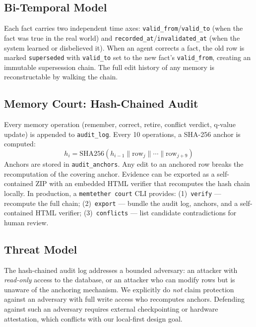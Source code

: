 \documentclass[11pt]{article}
\begin{document}
\subsection{Bi-Temporal Model}
Each fact carries two independent time axes: \texttt{valid\_from}/\texttt{valid\_to} (when the fact was true in the real world) and \texttt{recorded\_at}/\texttt{invalidated\_at} (when the system learned or disbelieved it). When an agent corrects a fact, the old row is marked \texttt{superseded} with \texttt{valid\_to} set to the new fact's \texttt{valid\_from}, creating an immutable supersession chain. The full edit history of any memory is reconstructable by walking the chain.

\subsection{Memory Court: Hash-Chained Audit}
Every memory operation (remember, correct, retire, conflict verdict, q-value update) is appended to \texttt{audit\_log}. Every 10 operations, a SHA-256 anchor is computed:
\[
h_i = \text{SHA256}(h_{i-1} \| \text{row}_{j} \| \cdots \| \text{row}_{j+9})
\]
Anchors are stored in \texttt{audit\_anchors}. Any edit to an anchored row breaks the recomputation of the covering anchor. Evidence can be exported as a self-contained ZIP with an embedded HTML verifier that recomputes the hash chain locally. In production, a \texttt{memtether court} CLI provides: (1)~\texttt{verify} --- recompute the full chain; (2)~\texttt{export} --- bundle the audit log, anchors, and a self-contained HTML verifier; (3)~\texttt{conflicts} --- list candidate contradictions for human review.

\subsection{Threat Model}
\label{sec:threat}
The hash-chained audit log addresses a bounded adversary: an attacker with \emph{read-only} access to the database, or an attacker who can modify rows but is unaware of the anchoring mechanism. We explicitly do \emph{not} claim protection against an adversary with full write access who recomputes anchors. Defending against such an adversary requires external checkpointing or hardware attestation, which conflicts with our local-first design goal.
\end{document}
